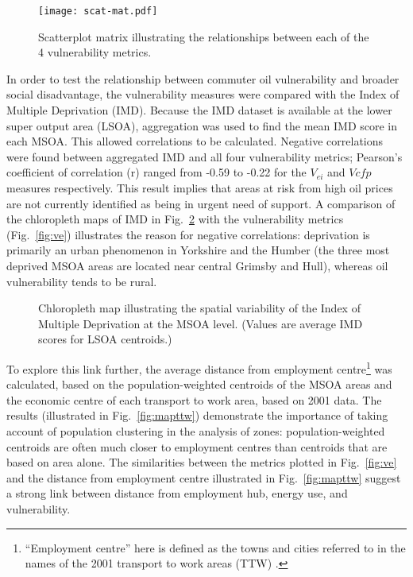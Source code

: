 \begin{figure}[t]
 \centering
\texttt{[image: scat-mat.pdf]}
 \caption[Scatterplot matrix of vulnerability metrics]
 {Scatterplot matrix illustrating the relationships between each of
the 4 vulnerability metrics.}
 \label{fig:scat-mat}
\end{figure}

In order to test the relationship between commuter oil vulnerability and
broader social disadvantage, the vulnerability measures were compared
with the Index of Multiple Deprivation (IMD). Because the IMD dataset is available
at the lower super output area (LSOA), aggregation was used to find the mean
IMD score in each MSOA. This allowed correlations to be calculated.
Negative correlations were found between aggregated IMD and
all four vulnerability metrics;
Pearson's coefficient of correlation
(r) ranged from -0.59 to -0.22
for the $V_{ei}$ and $V{cfp}$ measures respectively.
This result implies that
areas at risk from high oil prices are not currently identified as
being in urgent need of support. A comparison of the chloropleth maps
of IMD in Fig.~\ref{fig:IMD} with the vulnerability metrics
(Fig.~\ref{fig:ve}) illustrates the reason
for negative correlations: deprivation is primarily an urban phenomenon in
Yorkshire and the Humber (the three most deprived MSOA areas
are located near central Grimsby and Hull),
whereas oil vulnerability tends to be rural.

\begin{figure}[t]
 \centering
 \caption[Chloropleth map of deprivation in Yorkshire and the Humber]
 {Chloropleth map illustrating the spatial variability of
the Index of Multiple Deprivation at the MSOA level. (Values are
average IMD scores for LSOA centroids.)}
 \label{fig:IMD}
\end{figure}

To explore this link further, the average distance from employment
centre\footnote{``Employment centre'' here is defined as the towns and cities
referred to in the names of the 2001 transport to work areas (TTW)
\citep{ONS2011-ttw}.} was calculated, based on the population-weighted centroids
of the MSOA areas and the economic centre of each transport to work area, based
on 2001 data. The results (illustrated in Fig.~\ref{fig:mapttw}) demonstrate
the importance of taking account of population clustering in the analysis of
zones: population-weighted centroids are often much closer to employment
centres than centroids that are based on area alone.
The similarities between
the metrics plotted in Fig.~\ref{fig:ve}
and the distance from employment centre illustrated in Fig.~\ref{fig:mapttw}
suggest a strong link between distance from employment hub, energy use, and
vulnerability.

